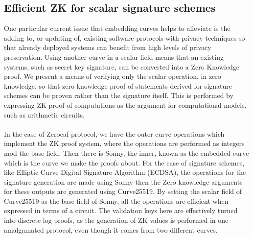 \documentclass{article}
\begin{document}
\subsection{Efficient ZK for scalar signature schemes}
One particular current issue that embedding curves helps to alleviate is the adding to, or updating of, existing software protocols with privacy techniques so that already deployed systems can benefit from high levels of privacy preservation. Using another curve in a scalar field means that an existing systems, such as secret key signature, can be converted into a Zero Knowledge proof. We present a means of verifying only the scalar operation, in zero knowledge, so that zero knowledge proof of statements derived for signature schemes can be proven rather than the signature itself. This is performed by expressing ZK proof of computations as the argument for computational models, such as arithmetic circuits.\\\\
In the case of Zerocaf protocol, we have the outer curve operations which implement the ZK proof system, where the operations are performed as integers mod the base field. Then there is Sonny, the inner, known as the embedded curve which is the curve we make the proofs about. For the case of signature schemes, like Elliptic Curve Digital Signature Algorithm (ECDSA), the operations for the signature generation are made using Sonny then the Zero knowledge arguments for these outputs are generated using Curve25519. By setting the scalar field of Curve25519 as the base field of Sonny, all the operations are efficient when expressed in terms of a circuit. The validation keys here are effectively turned into discrete log proofs, as the generation of ZK values is performed in one amalgamated protocol, even though it comes from two different curves. 
\end{document}
